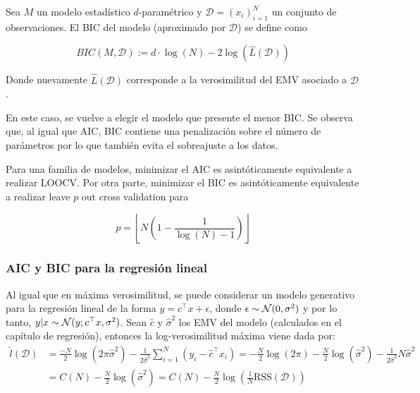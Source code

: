 \begin{definition}[BIC]
	Sea $M$ un modelo estadístico $d$-paramétrico y $\mathcal{D}=(x_i)_{i=1}^N$ un conjunto de observaciones. El BIC del modelo (aproximado por $\mathcal{D}$) se define como
	
	\begin{equation}
		BIC(M,\mathcal{D}):= d\cdot\log(N) - 2\log\left(\hat{L}(\mathcal{D})\right)
	\end{equation}
	
	Donde nuevamente $\hat{L}(\mathcal{D})$ corresponde a la verosimilitud del EMV asociado a $\mathcal{D}$.
\end{definition}

En este caso, se vuelve a elegir el modelo que presente el menor BIC. Se observa que, al igual que AIC, BIC contiene una penalización sobre el número de parámetros por lo que también evita el sobreajuste a los datos.

\begin{remark} Para una familia de modelos, minimizar el AIC es asintóticamente equivalente a realizar LOOCV. Por otra parte, minimizar el BIC es asintóticamente equivalente a realizar leave $p$ out cross validation para

\begin{equation}
	p=\left\lfloor N\left(1-\frac{1}{\log(N)-1}\right)\right\rfloor
\end{equation}
	
\end{remark}

\newpage

\subsubsection{AIC y BIC para la regresión lineal}

Al igual que en máxima verosimilitud, se puede considerar un modelo generativo para la regresión lineal de la forma $ y = c^\top x + \epsilon$, donde $\epsilon\sim{\mathcal N}(0,\sigma^2)$ y por lo tanto, $y|x \sim {\mathcal N}(y;c^\top x,\sigma^2)$. Sean $\hat{c}$ y $\hat{\sigma}^2$ los EMV del modelo (calculados en el capítulo de regresión), entonces la log-verosimilitud máxima viene dada por:
\begin{align}
	\hat{l}(\mathcal{D}) &= \frac{-N}{2}\log(2\pi\hat{\sigma}^2) - \frac{1}{2\hat{\sigma}^2} \sum_{i=1}^N( y_i-\hat{c}^\top x_i)= -\frac{N}{2}\log(2\pi) - \frac{N}{2}\log(\hat{\sigma}^2) - \frac{1}{2\hat{\sigma}^2}  N\hat{\sigma}^2\\
	&= C(N) - \frac{N}{2}\log(\hat{\sigma}^2) = C(N)- \frac{N}{2}\log\left(\frac{1}{N}\text{RSS}(\mathcal{D})\right)
\end{align}	

